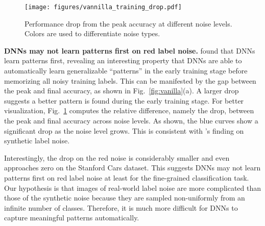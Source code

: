 \documentclass{article}
\begin{document}
\begin{figure}[ht]
\vspace{-3mm}
\centering
\texttt{[image: figures/vannilla\_training\_drop.pdf]}
\vspace{-5mm}
\caption{\label{fig:drop}Performance drop from the peak accuracy at different noise levels. Colors are used to differentiate noise types.}
\vspace{-3mm}
\end{figure}

{\bf DNNs may not learn patterns first on red label noise.} \citet{arpit2017closer} found that DNNs learn patterns first, revealing an interesting property that DNNs are able to automatically learn generalizable ``patterns'' in the early training stage before memorizing all noisy training labels. This can be manifested by the gap between the peak and final accuracy, as shown in Fig.~\ref{fig:vanilla}(a). A larger drop suggests a better pattern is found during the early training stage. For better visualization, Fig.~\ref{fig:drop} computes the relative difference, namely the drop, between the peak and final accuracy across noise levels. As shown, the blue curves show a significant drop as the noise level grows. This is consistent with \citet{arpit2017closer}'s finding on synthetic label noise.

Interestingly, the drop on the red noise is considerably smaller and even approaches zero on the Stanford Cars dataset. This suggests DNNs may not learn patterns first on red label noise at least for the fine-grained classification task. Our hypothesis is that images of real-world label noise are more complicated than those of the synthetic noise because they are sampled non-uniformly from an infinite number of classes. Therefore, it is much more difficult for DNNs to capture meaningful patterns automatically.
\end{document}
